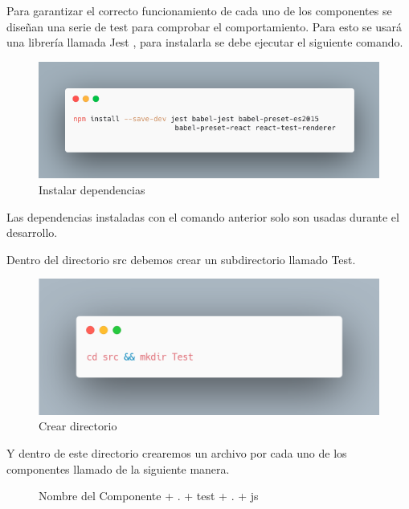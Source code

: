 Para garantizar el correcto funcionamiento de cada uno de los componentes se diseñan una serie de test para comprobar el comportamiento. Para esto se usará una librería llamada Jest \cite{jest} , para instalarla se debe ejecutar el siguiente comando.
\newline
\begin{figure}[H]
    \includegraphics[width=1\textwidth]{./Imagenes/8.39t.png}
    \caption[Instalar dependencias]{Instalar dependencias}
    \end{figure}
\newline
Las dependencias instaladas con el comando anterior solo son usadas durante el desarrollo.

Dentro del directorio src debemos crear un subdirectorio llamado Test.
\newline
\begin{figure}[H]
    \includegraphics[width=1\textwidth]{./Imagenes/8.40t.png}
    \caption[Crear directorio]{Crear directorio}
    \end{figure}
\newline
Y dentro de este directorio crearemos un archivo por cada uno de los componentes llamado de la siguiente manera.
\begin{figure}[H]
   Nombre del Componente + . + test + . + js
    \centering
    \end{figure}
    
